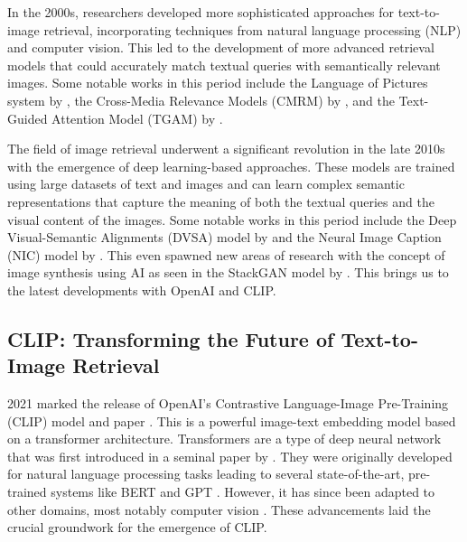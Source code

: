 \documentclass{l4proj}
\begin{document}
In the 2000s, researchers developed more sophisticated approaches for text-to-image retrieval, incorporating techniques from natural language processing (NLP) and computer vision. This led to the development of more advanced retrieval models that could accurately match textual queries with semantically relevant images. Some notable works in this period include the Language of Pictures system by \cite{lavrenko2003lop}, the Cross-Media Relevance Models (CMRM) by \cite{rasiwasia2010cmmr}, and the Text-Guided Attention Model (TGAM) by \cite{gao2018tgam}.

The field of image retrieval underwent a significant revolution in the late 2010s with the emergence of deep learning-based approaches. These models are trained using large datasets of text and images and can learn complex semantic representations that capture the meaning of both the textual queries and the visual content of the images. Some notable works in this period include the Deep Visual-Semantic Alignments (DVSA) model by \cite{karpathy2015dvsa} and the Neural Image Caption (NIC) model by \cite{vinyals2015nic}. This even spawned new areas of research with the concept of image synthesis using AI as seen in the StackGAN model by \cite{zhang2017stackgan}. This brings us to the latest developments with OpenAI and CLIP.


\subsection{CLIP: Transforming the Future of Text-to-Image Retrieval}
\label{sec:background_clip}
2021 marked the release of OpenAI's Contrastive Language-Image Pre-Training (CLIP) model and paper \citep{radford2021clip}. This is a powerful image-text embedding model based on a transformer architecture. Transformers are a type of deep neural network that was first introduced in a seminal paper by \cite{vaswani2017attention}. They were originally developed for natural language processing tasks leading to several state-of-the-art, pre-trained systems like BERT \citep{devlin2018bert} and GPT \citep{radford2018gpt}. However, it has since been adapted to other domains, most notably computer vision \citep{dosovitskiy2020vit}. These advancements laid the crucial groundwork for the emergence of CLIP.
\end{document}
